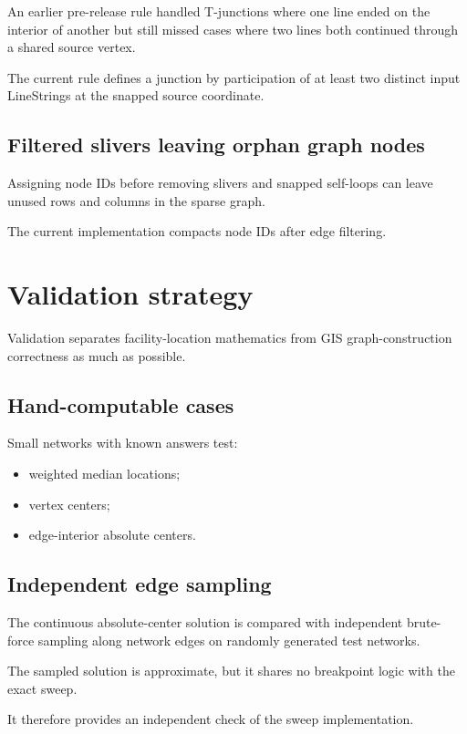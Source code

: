 \documentclass[11pt]{article}
\begin{document}
An earlier pre-release rule handled T-junctions where one line ended on the
interior of another but still missed cases where two lines both continued
through a shared source vertex.

The current rule defines a junction by participation of at least two distinct
input LineStrings at the snapped source coordinate.

\subsection{Filtered slivers leaving orphan graph nodes}

Assigning node IDs before removing slivers and snapped self-loops can leave
unused rows and columns in the sparse graph.

The current implementation compacts node IDs after edge filtering.

\section{Validation strategy}

Validation separates facility-location mathematics from GIS graph-construction
correctness as much as possible.

\subsection{Hand-computable cases}

Small networks with known answers test:

\begin{itemize}[leftmargin=1.5em]
\item weighted median locations;
\item vertex centers;
\item edge-interior absolute centers.
\end{itemize}

\subsection{Independent edge sampling}

The continuous absolute-center solution is compared with independent brute-force
sampling along network edges on randomly generated test networks.

The sampled solution is approximate, but it shares no breakpoint logic with the
exact sweep.

It therefore provides an independent check of the sweep implementation.
\end{document}
